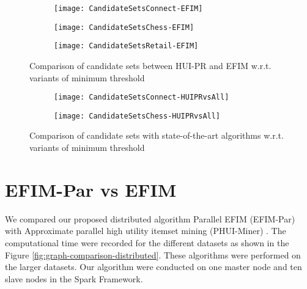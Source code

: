 \documentclass[11pt,openright]{report}
\begin{document}
\begin{figure}
	\centering
	\begin{subfigure}[b]{\textwidth}
		\centering
		\texttt{[image: CandidateSetsConnect-EFIM]}
		\label{fig:connect-candidatesets}
	\end{subfigure}
	\begin{subfigure}[b]{\textwidth}
		\centering
		\texttt{[image: CandidateSetsChess-EFIM]}
		\label{fig:chess-candidatesets}
	\end{subfigure}
	\begin{subfigure}[b]{\textwidth}
		\centering
		\texttt{[image: CandidateSetsRetail-EFIM]}
		\label{fig:retail-candidatesets}
	\end{subfigure}
	\caption{Comparison of candidate sets between HUI-PR and EFIM w.r.t. variants of minimum threshold}
	\label{fig:comparison-candidatesets-efim}
\end{figure}

\begin{figure}
	\centering
	\begin{subfigure}[b]{\textwidth}
		\centering
		\texttt{[image: CandidateSetsConnect-HUIPRvsAll]}
		\label{fig:graph-connect-candidatesets}
		\bigskip
	\end{subfigure}
	\begin{subfigure}[b]{\textwidth}
		\centering
		\texttt{[image: CandidateSetsChess-HUIPRvsAll]}
		\label{fig:graph-chess-candidatesets}
	\end{subfigure}
	\caption{Comparison of candidate sets with state-of-the-art algorithms w.r.t. variants of minimum threshold}
	\label{fig:graph-candidatesets-comparison}
\end{figure}

\section{EFIM-Par vs EFIM}
We compared our proposed distributed algorithm Parallel EFIM (EFIM-Par) with Approximate parallel high utility itemset mining (PHUI-Miner) \cite{Chen2016}. The computational time were recorded for the different datasets as shown in the Figure \ref{fig:graph-comparison-distributed}. These algorithms were performed on the larger datasets. Our algorithm were conducted on one master node and ten slave nodes in the Spark Framework.
\end{document}
